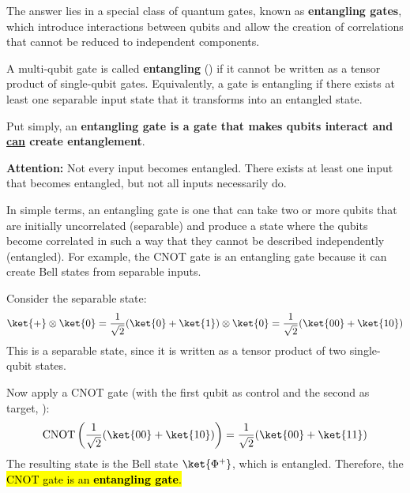 \highspace
The answer lies in a special class of quantum gates, known as \textbf{entangling gates}, which introduce interactions between qubits and allow the creation of correlations that cannot be reduced to independent components.

\highspace
\begin{definitionbox}
    A multi-qubit gate is called \textbf{entangling} () if it cannot be written as a tensor product of single-qubit gates. Equivalently, a gate is entangling if there exists at least one separable input state that it transforms into an entangled state.

    \highspace
    Put simply, an \textbf{entangling gate is a gate that makes qubits interact and \underline{can} create entanglement}.

    \highspace
    \textcolor{Red2}{ \textbf{Attention:}} Not every input becomes entangled. There exists at least one input that becomes entangled, but not all inputs necessarily do.
\end{definitionbox}

\noindent
In simple terms, an entangling gate is one that can take two or more qubits that are initially uncorrelated (separable) and produce a state where the qubits become correlated in such a way that they cannot be described independently (entangled). For example, the CNOT gate is an entangling gate because it can create Bell states from separable inputs.

\begin{examplebox}
    Consider the separable state:
    \begin{equation*}
        \ket{+} \otimes \ket{0}
        =
        \frac{1}{\sqrt{2}}(\ket{0} + \ket{1}) \otimes \ket{0}
        =
        \frac{1}{\sqrt{2}}(\ket{00} + \ket{10})
    \end{equation*}
    This is a separable state, since it is written as a tensor product of two single-qubit states.

    \highspace
    Now apply a CNOT gate (with the first qubit as control and the second as target, ):
    \begin{equation*}
        \text{CNOT} \left( \frac{1}{\sqrt{2}}(\ket{00} + \ket{10}) \right)
        =
        \frac{1}{\sqrt{2}}(\ket{00} + \ket{11})
    \end{equation*}
    The resulting state is the Bell state $\ket{\Phi^+}$, which is entangled. Therefore, the \hl{CNOT gate is an \textbf{entangling gate}.}
\end{examplebox}

